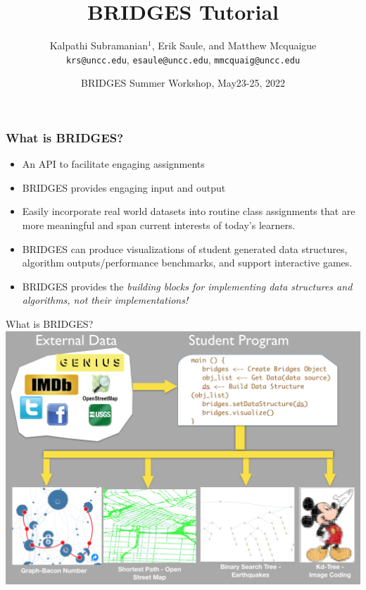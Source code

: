\documentclass[aspectratio=169]{beamer}
\title{BRIDGES Tutorial}
\subtitle{}
\author{Kalpathi Subramanian$^1$, Erik Saule, and Matthew Mcquaigue \\\texttt{krs@uncc.edu}, \texttt{esaule@uncc.edu}, \texttt{mmcquaig@uncc.edu}}
\institute{The University of North Carolina at Charlotte}
\date{BRIDGES Summer Workshop, May23-25, 2022\\}
\begin{document}
\begin{frame}
\titlepage
\end{frame}



\begin{frame}
  \frametitle{What is BRIDGES?}
\begin{itemize}
	\item An API to facilitate engaging assignments
	\item BRIDGES provides engaging input and output
	\item Easily incorporate real world datasets into routine
		class assignments that are more meaningful and span
		current interests of today's learners.
	\item BRIDGES can produce visualizations of student generated
		data structures, algorithm outputs/performance benchmarks, 
		and support interactive games.
	\item BRIDGES provides the \textsl{building blocks for implementing
		data structures and algorithms,  not their implementations!}
\end{itemize}
\end{frame}
\begin{frame}{What is BRIDGES?}
  \center\includegraphics[width=.7\linewidth]{fig/bridges-overview.png}
\end{frame}
\end{document}
